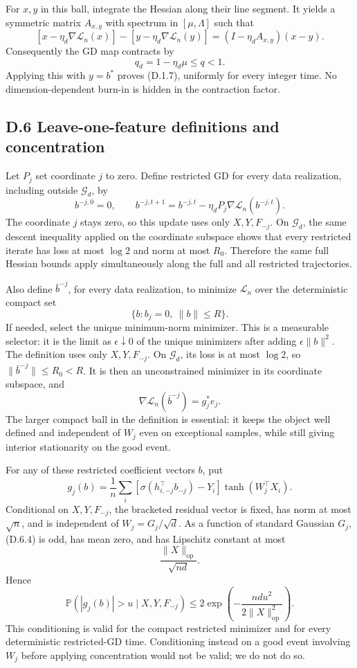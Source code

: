 \documentclass[
  11pt,
  a4paper,
]{article}
\begin{document}
For \(x,y\) in this ball, integrate the Hessian along their line
segment. It yields a symmetric matrix \(A_{x,y}\) with spectrum in
\([\mu,\Lambda]\) such that \[
[x-\eta_d\nabla\mathcal L_n(x)]-[y-\eta_d\nabla\mathcal L_n(y)]
=(I-\eta_dA_{x,y})(x-y).
\] Consequently the GD map contracts by \[
q_d=1-\eta_d\mu\leq q<1.
\tag{D.5.3}
\] Applying this with \(y=b^*\) proves (D.1.7), uniformly for every
integer time. No dimension-dependent burn-in is hidden in the
contraction factor.

\hypertarget{d.6-leave-one-feature-definitions-and-concentration}{%
\subsection{D.6 Leave-one-feature definitions and
concentration}\label{d.6-leave-one-feature-definitions-and-concentration}}

Let \(P_j\) set coordinate \(j\) to zero. Define restricted GD for every
data realization, including outside \(\mathcal G_d\), by \[
b^{-j,0}=0,\qquad
b^{-j,t+1}=b^{-j,t}-\eta_d P_j\nabla\mathcal L_n(b^{-j,t}).
\tag{D.6.1}
\] The coordinate \(j\) stays zero, so this update uses only
\(X,Y,F_{-j}\). On \(\mathcal G_d\), the same descent inequality applied
on the coordinate subspace shows that every restricted iterate has loss
at most \(\log2\) and norm at most \(R_0\). Therefore the same full
Hessian bounds apply simultaneously along the full and all restricted
trajectories.

Also define \(\bar b^{-j}\), for every data realization, to minimize
\(\mathcal L_n\) over the deterministic compact set \[
\{b:b_j=0,\ \|b\|\leq R\}.
\tag{D.6.2}
\] If needed, select the unique minimum-norm minimizer. This is a
measurable selector: it is the limit as \(\epsilon\downarrow0\) of the
unique minimizers after adding \(\epsilon\|b\|^2\). The definition uses
only \(X,Y,F_{-j}\). On \(\mathcal G_d\), its loss is at most \(\log2\),
so \(\|\bar b^{-j}\|\leq R_0<R\). It is then an unconstrained minimizer
in its coordinate subspace, and \[
\nabla\mathcal L_n(\bar b^{-j})=g_j^*e_j.
\tag{D.6.3}
\] The larger compact ball in the definition is essential: it keeps the
object well defined and independent of \(W_j\) even on exceptional
samples, while still giving interior stationarity on the good event.

For any of these restricted coefficient vectors \(b\), put \[
g_j(b)=\frac1n\sum_i
 [\sigma(h_{i,-j}^\top b_{-j})-Y_i]\tanh(W_j^\top X_i).
\tag{D.6.4}
\] Conditional on \(X,Y,F_{-j}\), the bracketed residual vector is
fixed, has norm at most \(\sqrt n\), and is independent of
\(W_j=G_j/\sqrt d\). As a function of standard Gaussian \(G_j\), (D.6.4)
is odd, has mean zero, and has Lipschitz constant at most \[
\frac{\|X\|_{\mathrm{op}}}{\sqrt{nd}}.
\tag{D.6.5}
\] Hence \[
\mathbb P(|g_j(b)|>u\mid X,Y,F_{-j})
\leq2\exp\!\left(-\frac{ndu^2}{2\|X\|_{\mathrm{op}}^2}\right).
\tag{D.6.6}
\] This conditioning is valid for the compact restricted minimizer and
for every deterministic restricted-GD time. Conditioning instead on a
good event involving \(W_j\) before applying concentration would not be
valid; we do not do so.
\end{document}
